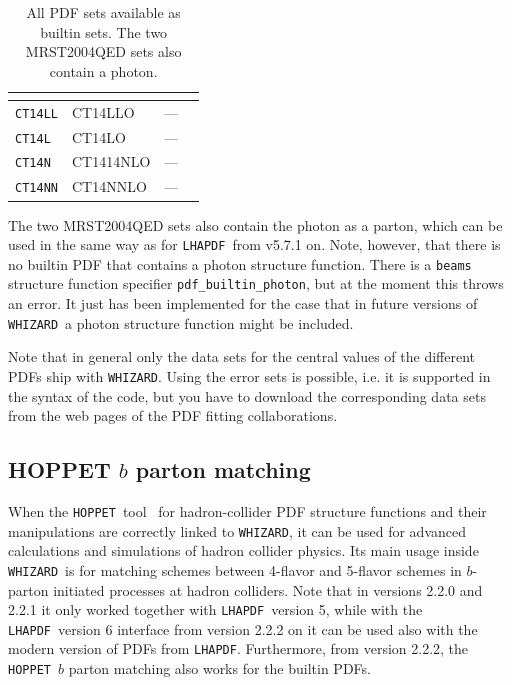 \documentclass[12pt]{book}
\newcommand{\ttt}[1]{\texttt{#1}}
\newcommand{\whizard}{\ttt{WHIZARD}}
\newcommand{\lhapdf}{\ttt{LHAPDF}}
\newcommand{\hoppet}{\ttt{HOPPET}}
\begin{document}
\begin{table}
{\begin{tabular}{|l||l|p{}|l|}
   \cite{Harland-Lang:2014zoa} \\\hline
\hline
\ttt{CT14LL} & CT14LLO & \mbox{}\hfill---\hfill\mbox{} &
   \cite{Dulat:2015mca} \\\hline
\ttt{CT14L} & CT14LO & \mbox{}\hfill---\hfill\mbox{} &
   \cite{Dulat:2015mca} \\\hline
\ttt{CT14N} & CT1414NLO & \mbox{}\hfill---\hfill\mbox{} &
   \cite{Dulat:2015mca} \\\hline
\ttt{CT14NN} & CT14NNLO & \mbox{}\hfill---\hfill\mbox{} &
   \cite{Dulat:2015mca} \\\hline
\hline
%
\end{tabular}}
\caption{All PDF sets available as builtin sets. The two MRST2004QED
  sets also contain a photon.}
\label{tab:pdfs}
\end{table}

The two MRST2004QED sets also contain the photon as a parton, which
can be used in the same way as for \lhapdf\ from v5.7.1 on. Note,
however, that there is no builtin PDF that contains a photon structure
function. There is a \ttt{beams} structure function specifier
\ttt{pdf\_builtin\_photon}, but at the moment this throws an error. It
just has been implemented for the case that in future versions of
\whizard\ a photon structure function might be included.

Note that in general only the data sets for the central values of the
different PDFs ship with \whizard. Using the error sets is possible,
i.e. it is supported in the syntax of the code, but you have to
download the corresponding data sets from the web pages of the PDF
fitting collaborations.


\subsection{HOPPET $b$ parton matching}

When the \hoppet\ tool~\cite{Salam:2008qg} for hadron-collider PDF
structure functions and their manipulations are
correctly linked to \whizard, it can be used for advanced
calculations and simulations of hadron collider physics. Its main
usage inside \whizard\ is for matching schemes between 4-flavor and
5-flavor schemes in $b$-parton initiated processes at hadron
colliders. Note that in versions 2.2.0 and 2.2.1 it only worked
together with \lhapdf\ version 5, while with the \lhapdf\ version 6
interface from version 2.2.2 on it can be used also with the modern
version of PDFs from \lhapdf. Furthermore, from version 2.2.2, the
\hoppet\ $b$ parton matching also works for the builtin PDFs.
\end{document}
